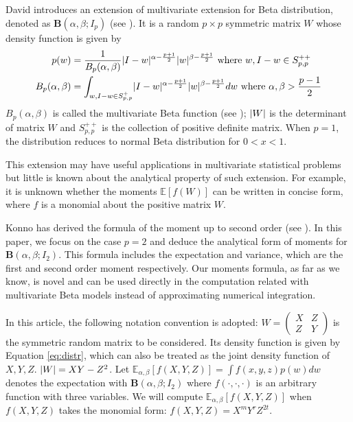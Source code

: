 \documentclass{elsarticle}
\DeclarePairedDelimiter\abs{\lvert}{\rvert}
\def\E{\mathbb{E}}
\begin{document}
David introduces an extension of
multivariate extension for Beta distribution,
denoted as $\mathbf{B}(\alpha, \beta; I_p)$ (see \cite{david1981}).
It is a random $p\times p$  symmetric matrix $W$ whose density
function is given by
\begin{align}
p(w) &= \frac{1}{B_p(\alpha, \beta)}\abs{I-w}^{\alpha-\frac{p+1}{2}}
\abs{w}^{\beta-\frac{p+1}{2}} \textrm{ where } w, I-w \in S_{p,p}^{++}
\label{eq:distr}\\
B_p(\alpha, \beta) &= \int_{w,I-w \in S_{p,p}^{+} }\abs{I-w}^{\alpha-\frac{p+1}{2}}
\abs{w}^{\beta-\frac{p+1}{2}}dw \textrm{ where } \alpha, \beta > \frac{p-1}{2}
\end{align}
$B_p(\alpha, \beta)$ is called the multivariate Beta function (see \cite{siegel_1935}); 
$\abs{W}$ is the determinant of matrix $W$ and $S_{p,p}^{++}$ is the 
collection of positive
definite matrix.
When $p=1$, the distribution reduces to normal Beta distribution for
$0<x<1$.

This extension may have useful applications in multivariate statistical
problems but little is known about the analytical property of such extension.
For example, it is unknown whether the moments $\E[f(W)]$ can be written in concise form,
where $f$ is a monomial about the positive matrix $W$.

Konno has derived the formula of the moment up to second order (see \cite{konno_1988}).
In this paper, we focus on the case $p=2$ and deduce the analytical form of 
moments for $\mathbf{B}(\alpha, \beta; I_2)$.
This formula
includes the expectation and variance, which are the first and second
order moment respectively. Our moments formula, as
far as we know, is novel and can be used directly in the computation
related with multivariate Beta models instead of approximating
numerical integration.

In this article, the following notation convention is adopted:
$W=\begin{pmatrix} X & Z \\ Z & Y \end{pmatrix}$ is the symmetric random
matrix to be considered. Its density function is given by Equation \eqref{eq:distr}, which can
also be treated as the joint density function of $X,Y,Z$.
$\abs{W}=XY-Z^2$.
Let $\E_{\alpha,\beta}[f(X,Y, Z)] = \int f(x,y,z)p(w)dw$ denotes the expectation
with $\mathbf{B}(\alpha, \beta;I_2)$ where $f(\cdot, \cdot, \cdot)$ is an arbitrary function with three
variables. We will compute $\E_{\alpha,\beta}[f(X,Y, Z)]$
when $f(X,Y,Z)$ takes the monomial form: $f(X,Y,Z)=X^m Y^r Z^{2t}$.
\end{document}
